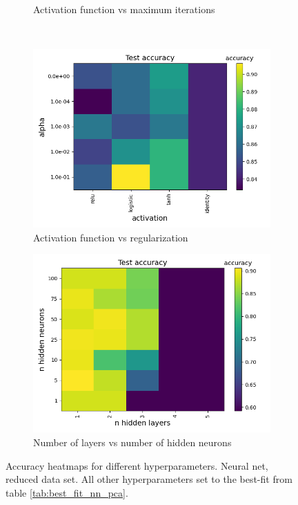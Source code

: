 \documentclass[a4paper]{article}
\begin{document}
\begin{figure}[H]
\begin{subfigure}{0.49\textwidth}
    \caption{Activation function vs maximum iterations}
  \end{subfigure}\\
  \begin{subfigure}{0.49\textwidth}
    \includegraphics[scale=0.45]{../figures/neural_net/heatmaps/heatmap_nbins200_pca35_seed4155_ts0.20_accuracy_activation_alpha.png}
    \caption{Activation function vs regularization}
  \end{subfigure}
  \begin{subfigure}{0.49\textwidth}
    \includegraphics[scale=0.45]{../figures/neural_net/heatmaps/heatmap_nbins200_pca35_seed4155_ts0.20_accuracy_n_hidden_layers_n_hidden_neurons.png}
    \caption{Number of layers vs number of hidden neurons}
  \end{subfigure}
  \caption{Accuracy heatmaps for different hyperparameters. Neural net, reduced data set. All other hyperparameters set to the best-fit from table \ref{tab:best_fit_nn_pca}.}
  \label{fig:app_nn_pca}
\end{figure}
\end{document}
